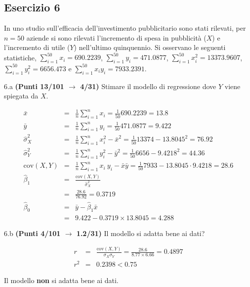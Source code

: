 \documentclass[
  11pt,
]{book}
\theoremstyle{mytheoremstyle}
\theoremstyle{mydefstyle}
\newenvironment{sol}
  {
  \begin{tcolorbox}[enhanced,breakable,arc=0.1mm,boxrule=1pt,colback=white,colframe=iblue,
  title=\bf \fontfamily{lmss}\selectfont \hspace{.5 cm} Soluzione,drop fuzzy shadow]

}{
\end{tcolorbox}
  }
\begin{document}
\subsection{Esercizio 6}\label{esercizio-6-23}

In uno studio sull'efficacia dell'investimento pubblicitario sono stati rilevati, per \(n=50\) aziende si sono rilevati l'incremento di spesa in
pubblicità (\(X\)) e l'incremento di utile (\(Y\)) nell'ultimo quinquennio. Si osservano le seguenti statistiche, \(\sum_{i=1}^{50}x_i=690.2239\), \(\sum_{i=1}^{50}y_i=471.0877\),
\(\sum_{i=1}^{50}x_i^2=13373.9607\), \(\sum_{i=1}^{50}y_i^2=6656.473\) e \(\sum_{i=1}^{50}x_iy_i=7933.2391\).

6.a \textbf{(Punti 13/101 \(\rightarrow\) 4/31)} Stimare il modello di regressione dove \(Y\) viene spiegata da \(X\).

\begin{sol}
\begin{eqnarray*}
           \bar x &=&\frac 1 n\sum_{i=1}^n x_i = \frac {1}{ 50 }  690.2239 =  13.8 \\
           \bar y &=&\frac 1 n\sum_{i=1}^n y_i = \frac {1}{ 50 }  471.0877 =  9.422 \\
           \hat\sigma_X^2&=&\frac 1 n\sum_{i=1}^n x_i^2-\bar x^2=\frac {1}{ 50 }  13374  - 13.8045 ^2= 76.92 \\
           \hat\sigma_Y^2&=&\frac 1 n\sum_{i=1}^n y_i^2-\bar y^2=\frac {1}{ 50 }  6656  - 9.4218 ^2= 44.36 \\
           \text{cov}(X,Y)&=&\frac 1 n\sum_{i=1}^n x_i~y_i-\bar x\bar y=\frac {1}{ 50 }  7933 - 13.8045 \cdot 9.4218 = 28.6 \\
           \hat\beta_1 &=& \frac{\text{cov}(X,Y)}{\hat\sigma_X^2} \\
                    &=& \frac{ 28.6 }{ 76.92 }  =  0.3719 \\
           \hat\beta_0 &=& \bar y - \hat\beta_1 \bar x\\
                    &=&  9.422 - 0.3719 \times  13.8045 = 4.288 
         \end{eqnarray*}

\end{sol}

6.b \textbf{(Punti 4/101 \(\rightarrow\) 1.2/31)} Il modello si adatta bene ai dati?

\begin{sol}
\begin{eqnarray*}
r&=&\frac{\text{cov}(X,Y)}{\sigma_X\sigma_Y}=\frac{ 28.6 }{ 8.77 \times 6.66 }= 0.4897 \\ 
r^2&=& 0.2398 < 0.75
\end{eqnarray*}

Il modello \textbf{non} si adatta bene ai dati.

\end{sol}
\end{document}
